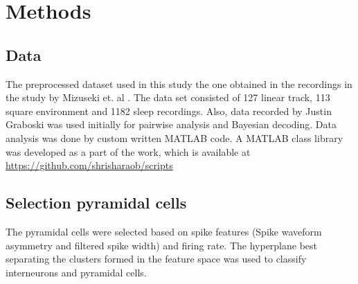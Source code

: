 \chapter{Methods}
\label{analysis}

\section{Data}
The preprocessed dataset used in this study the one obtained in the recordings in the study by Mizuseki et. al \cite{Mizuseki2012}. The data set consisted of 127 linear track, 113 square environment and 1182 sleep recordings. Also, data recorded by Justin Graboski was used initially for pairwise analysis and Bayesian decoding. Data analysis was done by custom written MATLAB code. A MATLAB class library was developed as a part of the work, which is available at \url{https://github.com/shrisharaob/scripts}

\section{Selection pyramidal cells}
The pyramidal cells were selected based on spike features (Spike waveform asymmetry and filtered spike width) \cite{Sirota2008} and firing rate. The hyperplane best separating the clusters formed in the feature space was used to classify interneurons and pyramidal cells.


